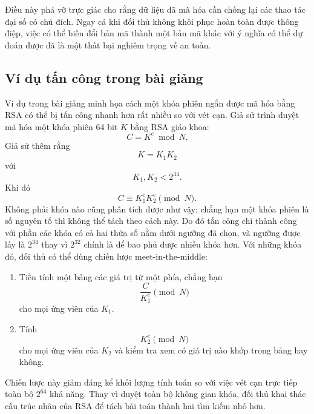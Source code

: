 Điều này phá vỡ trực giác cho rằng dữ liệu đã mã hóa cần chống lại các thao tác đại số có chủ đích. Ngay cả khi đối thủ không khôi phục hoàn toàn được thông điệp, việc có thể biến đổi bản mã thành một bản mã khác với ý nghĩa có thể dự đoán được đã là một thất bại nghiêm trọng về an toàn.

\subsection{Ví dụ tấn công trong bài giảng}

Ví dụ trong bài giảng minh họa cách một khóa phiên ngắn được mã hóa bằng RSA có thể bị tấn công nhanh hơn rất nhiều so với vét cạn. Giả sử trình duyệt mã hóa một khóa phiên 64 bit $K$ bằng RSA giáo khoa:
\[
C = K^e \bmod N.
\]
Giả sử thêm rằng
\[
K = K_1K_2
\]
với
\[
K_1, K_2 < 2^{34}.
\]
Khi đó
\[
C \equiv K_1^e K_2^e \pmod{N}.
\]
Không phải khóa nào cũng phân tích được như vậy; chẳng hạn một khóa phiên là số nguyên tố thì không thể tách theo cách này. Do đó tấn công chỉ thành công với phần các khóa có cả hai thừa số nằm dưới ngưỡng đã chọn, và ngưỡng được lấy là $2^{34}$ thay vì $2^{32}$ chính là để bao phủ được nhiều khóa hơn. Với những khóa đó, đối thủ có thể dùng chiến lược meet-in-the-middle:

\begin{enumerate}
\item Tiền tính một bảng các giá trị từ một phía, chẳng hạn
\[
\frac{C}{K_1^e} \pmod{N}
\]
cho mọi ứng viên của $K_1$.
\item Tính
\[
K_2^e \pmod{N}
\]
cho mọi ứng viên của $K_2$ và kiểm tra xem có giá trị nào khớp trong bảng hay không.
\end{enumerate}

Chiến lược này giảm đáng kể khối lượng tính toán so với việc vét cạn trực tiếp toàn bộ $2^{64}$ khả năng. Thay vì duyệt toàn bộ không gian khóa, đối thủ khai thác cấu trúc nhân của RSA để tách bài toán thành hai tìm kiếm nhỏ hơn.


